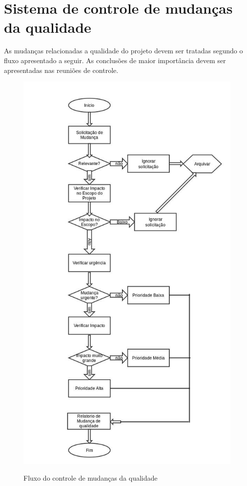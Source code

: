 \section*{Sistema de controle de mudanças da qualidade}
	As mudanças relacionadas a qualidade do projeto devem ser tratadas segundo o fluxo apresentado a seguir. As conclusões de maior importância devem ser apresentadas nas reuniões de controle.
   \begin{figure}[!h]
    \centering
    \includegraphics[scale = 0.6]{editaveis/figuras/fluxo_qualidade}
    \label{fluxo_qualidade}
    \caption{Fluxo do controle de mudanças da qualidade}
   \end{figure}
   \FloatBarrier
   
